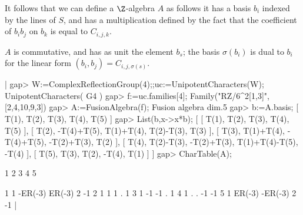 It follows that we can define a $\Z$-algebra $A$ as follows\: it has a basis
$b_i$  indexed by the lines of $S$, and has a multiplication defined by the
fact that the coefficient of $b_ib_j$ on $b_k$ is equal to $C_{i,j,k}$.

$A$  is  commutative,  and  has  as  unit  the  element  $b_s$;  the  basis
$\sigma(b_i)$ is dual to $b_i$ for the linear form
$(b_i,b_j)=C_{i,j,\sigma(s)}$.

|    gap> W:=ComplexReflectionGroup(4);;uc:=UnipotentCharacters(W);
    UnipotentCharacters( G4 )
    gap> f:=uc.families[4];
    Family("RZ/6^2[1,3]",[2,4,10,9,3])
    gap> A:=FusionAlgebra(f);
    Fusion algebra dim.5
    gap> b:=A.basis;
    [ T(1), T(2), T(3), T(4), T(5) ]
    gap> List(b,x->x*b);
    [ [ T(1), T(2), T(3), T(4), T(5) ],
      [ T(2), -T(4)+T(5), T(1)+T(4), T(2)-T(3), T(3) ],
      [ T(3), T(1)+T(4), -T(4)+T(5), -T(2)+T(3), T(2) ],
      [ T(4), T(2)-T(3), -T(2)+T(3), T(1)+T(4)-T(5), -T(4) ],
      [ T(5), T(3), T(2), -T(4), T(1) ] ]
    gap> CharTable(A);

        1        2        3   4   5

    1   1  -ER(-3)   ER(-3)   2  -1
    2   1        1        1   .   1
    3   1       -1       -1   .   1
    4   1        .        .  -1  -1
    5   1   ER(-3)  -ER(-3)   2  -1
|

